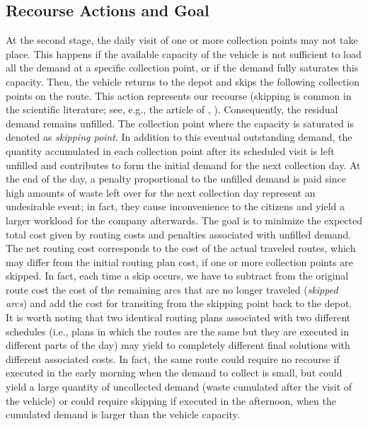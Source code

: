 \documentclass[authoryear,preprint,12pt]{elsarticle}
\newcommand{\rev}[1]{\textcolor{blue}{{#1}}}
\begin{document}
\subsection{Recourse Actions and Goal}
At the second stage, the daily visit of one or more collection points may not take place. This happens 
if the available capacity of the vehicle is not sufficient to load all the demand at a specific collection point, or if the demand fully saturates this capacity. Then, the vehicle returns to the depot and skips the following collection points on the route. This action represents our recourse (skipping is common in the scientific literature; see, e.g., the article of \citeauthor{Beraldi2010}, \citeyear{Beraldi2010}).
Consequently, the residual demand remains unfilled. The collection point where the capacity is saturated is denoted as \textit{skipping point}.
In addition to this eventual outstanding demand, the quantity accumulated in each collection point after its scheduled visit is left unfilled and contributes to form the initial demand for the next collection day.
At the end of the day, a penalty proportional to the unfilled demand is paid since high amounts of waste left over for the next collection day represent an undesirable event; in fact, they cause inconvenience to the citizens and yield a larger workload for the company afterwards.
The goal is to minimize the expected total cost given by routing costs and penalties associated with unfilled demand.
The net routing cost corresponds to the cost of the actual traveled routes, which may differ from the initial routing plan cost, if one or more collection points are skipped. In fact, each time a skip occurs, we have to subtract from the original route cost the cost of the remaining arcs that are no longer traveled (\textit{skipped arcs}) and add the cost for transiting from the skipping point back to the depot.
It is worth noting that two identical routing plans associated with two different schedules (i.e., plans in which the routes are the same but they are executed in different parts of the day) may yield to completely different final solutions with different associated costs.
In fact, the same route could require no recourse if executed in the early morning when the demand to collect is small, but could yield a large quantity of uncollected demand (waste cumulated after the visit of the vehicle) or could require skipping if executed in the afternoon, when the cumulated demand is larger than the vehicle capacity.
\end{document}
